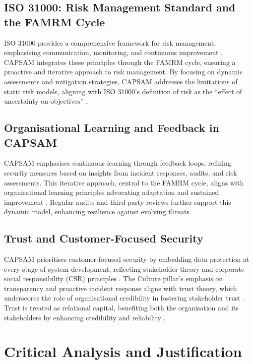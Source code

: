     \subsection{ISO 31000: Risk Management Standard and the FAMRM Cycle}
    ISO 31000 provides a comprehensive framework for risk management, emphasising communication, monitoring, and continuous improvement \citep{purdy2010iso}. CAPSAM integrates these principles through the FAMRM cycle, ensuring a proactive and iterative approach to risk management. By focusing on dynamic assessments and mitigation strategies, CAPSAM addresses the limitations of static risk models, aligning with ISO 31000's definition of risk as the ``effect of uncertainty on objectives'' \citep{purdy2010iso}.
    
    \subsection{Organisational Learning and Feedback in CAPSAM}
    CAPSAM emphasises continuous learning through feedback loops, refining security measures based on insights from incident responses, audits, and risk assessments. This iterative approach, central to the FAMRM cycle, aligns with organisational learning principles advocating adaptation and sustained improvement \citep{murray2003continuous}. Regular audits and third-party reviews further support this dynamic model, enhancing resilience against evolving threats.
    
    \subsection{Trust and Customer-Focused Security}
    CAPSAM prioritises customer-focused security by embedding data protection at every stage of system development, reflecting stakeholder theory and corporate social responsibility (CSR) principles \citep{moir2001csr, parmar2010stakeholder}. The Culture pillar's emphasis on transparency and proactive incident response aligns with trust theory, which underscores the role of organisational credibility in fostering stakeholder trust \citep{castelfranchi2010trust}. Trust is treated as relational capital, benefiting both the organisation and its stakeholders by enhancing credibility and reliability \citep{castelfranchi2010trust}.      

\section{Critical Analysis and Justification}

